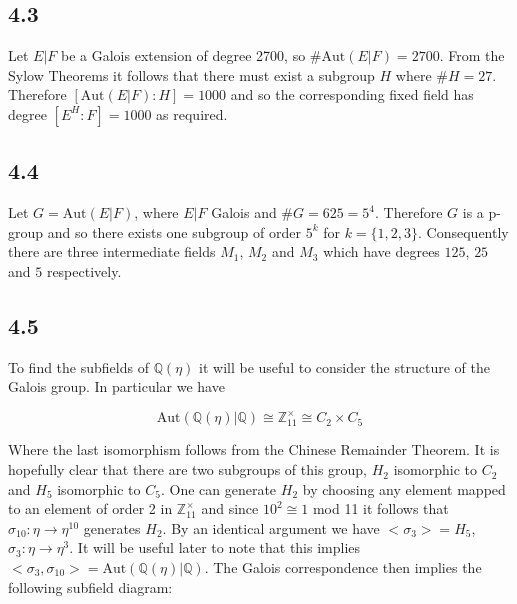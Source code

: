 \documentclass{article}
\begin{document}
\subsection*{4.3}
Let $E|F$ be a Galois extension of degree 2700, so $\#\text{Aut}(E|F) = 2700$. From the Sylow Theorems 
it follows that there must exist a subgroup $H$ where $\#H = 27$. Therefore $[\text{Aut}(E|F):H] = 1000$ and so 
the corresponding fixed field has degree $[E^H:F] = 1000$ as required.

\subsection*{4.4}
Let $G = \text{Aut}(E|F)$, where $E|F$ Galois and $\#G=625 = 5^4$. Therefore $G$ is a p-group and 
so there exists one subgroup of order $5^k$ for $k = \{1,2,3\}$. Consequently there are three intermediate 
fields $M_1$, $M_2$ and $M_3$ which have degrees $125$, $25$ and $5$ respectively.

\subsection*{4.5}
To find the subfields of $\mathbb{Q}(\eta)$ it will be useful to consider the structure of the 
Galois group. In particular we have 

\begin{equation*}
    \text{Aut}(\mathbb{Q}(\eta)|\mathbb{Q}) \cong \mathbb{Z}_{11}^\times \cong C_2 \times C_5
\end{equation*}

Where the last isomorphism follows from the Chinese Remainder Theorem. It is hopefully clear that 
there are two subgroups of this group, $H_2$ isomorphic to $C_2$ and $H_5$ isomorphic to $C_5$. 
One can generate $H_2$ by choosing any element mapped to an element of order 2 in 
$\mathbb{Z}_{11}^\times$ and since $10^2 \cong 1$ mod 11 it follows that $\sigma_{10}:\eta \rightarrow \eta^{10}$ 
generates $H_2$. By an identical argument we have $<\sigma_3> = H_5$, $\sigma_3:\eta \rightarrow \eta^3$. 
It will be useful later to note that this implies $<\sigma_3,\sigma_{10}> = \text{Aut}(\mathbb{Q}(\eta)|\mathbb{Q})$. 
The Galois correspondence then implies the following subfield diagram:

\begin{figure}[H]
    \centering
\end{figure}
\end{document}
